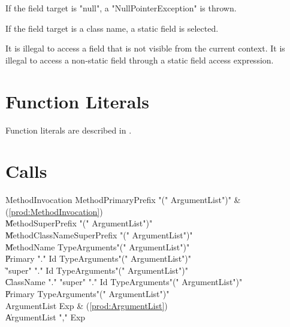 If the field target is \xcd"null", a \xcd"NullPointerException"
is thrown.

If the field target is a class name, a static field is selected.

It is illegal to access  a field that is not visible from
the current context.
It is illegal to access a non-static field
through a static field access expression.

\section{Function Literals}
Function literals are described in .

\section{Calls}
\label{Call}
\label{MethodInvocation}
\label{MethodInvocationSubstitution}


\begin{bbgrammar}
    MethodInvocation \: MethodPrimaryPrefix \xcd"(" ArgumentList\opt \xcd")" & (\ref{prod:MethodInvocation}) \\
                    \| MethodSuperPrefix \xcd"(" ArgumentList\opt \xcd")" \\
                    \| MethodClassNameSuperPrefix \xcd"(" ArgumentList\opt \xcd")" \\
                    \| MethodName TypeArguments\opt \xcd"(" ArgumentList\opt \xcd")" \\
                    \| Primary \xcd"." Id TypeArguments\opt \xcd"(" ArgumentList\opt \xcd")" \\
                    \| \xcd"super" \xcd"." Id TypeArguments\opt \xcd"(" ArgumentList\opt \xcd")" \\
                    \| ClassName \xcd"." \xcd"super"  \xcd"." Id TypeArguments\opt \xcd"(" ArgumentList\opt \xcd")" \\
                    \| Primary TypeArguments\opt \xcd"(" ArgumentList\opt \xcd")" \\
        ArgumentList \: Exp & (\ref{prod:ArgumentList}) \\
                    \| ArgumentList \xcd"," Exp \\
\end{bbgrammar}


